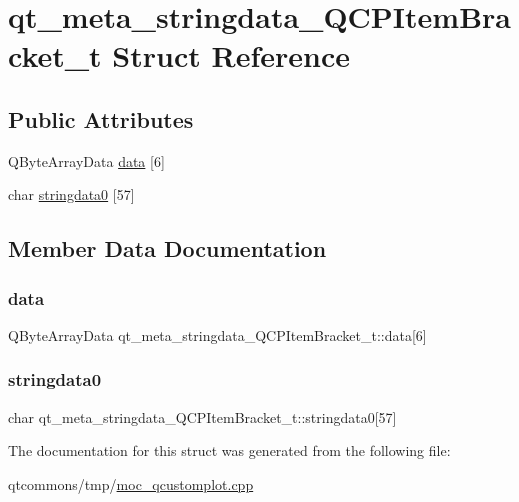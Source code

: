 \hypertarget{structqt__meta__stringdata___q_c_p_item_bracket__t}{}\section{qt\+\_\+meta\+\_\+stringdata\+\_\+\+Q\+C\+P\+Item\+Bracket\+\_\+t Struct Reference}
\label{structqt__meta__stringdata___q_c_p_item_bracket__t}
\subsection*{Public Attributes}
\begin{DoxyCompactItemize}
\item 
Q\+Byte\+Array\+Data \mbox{\hyperlink{structqt__meta__stringdata___q_c_p_item_bracket__t_a04f22517de87af81f9d91787ee9d1b14}{data}} \mbox{[}6\mbox{]}
\item 
char \mbox{\hyperlink{structqt__meta__stringdata___q_c_p_item_bracket__t_ae85fb7aa008efd4a52c6b1a2a93e788d}{stringdata0}} \mbox{[}57\mbox{]}
\end{DoxyCompactItemize}


\subsection{Member Data Documentation}
\mbox{\label{structqt__meta__stringdata___q_c_p_item_bracket__t_a04f22517de87af81f9d91787ee9d1b14}} 
\subsubsection{\texorpdfstring{data}{data}}
{\footnotesize\ttfamily Q\+Byte\+Array\+Data qt\+\_\+meta\+\_\+stringdata\+\_\+\+Q\+C\+P\+Item\+Bracket\+\_\+t\+::data\mbox{[}6\mbox{]}}

\mbox{\label{structqt__meta__stringdata___q_c_p_item_bracket__t_ae85fb7aa008efd4a52c6b1a2a93e788d}} 
\subsubsection{\texorpdfstring{stringdata0}{stringdata0}}
{\footnotesize\ttfamily char qt\+\_\+meta\+\_\+stringdata\+\_\+\+Q\+C\+P\+Item\+Bracket\+\_\+t\+::stringdata0\mbox{[}57\mbox{]}}



The documentation for this struct was generated from the following file\+:\begin{DoxyCompactItemize}
\item 
qtcommons/tmp/\mbox{\hyperlink{moc__qcustomplot_8cpp}{moc\+\_\+qcustomplot.\+cpp}}\end{DoxyCompactItemize}
